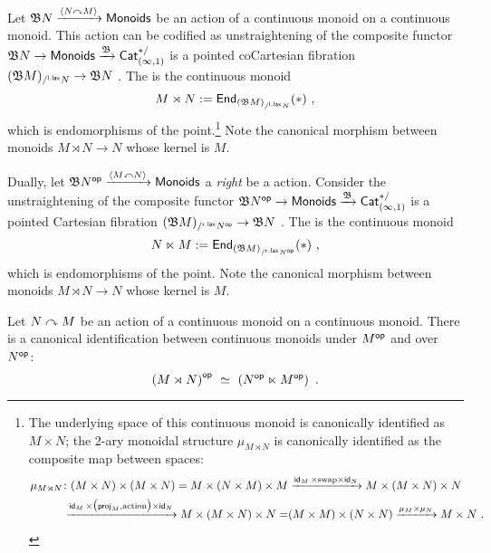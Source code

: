 Let $\mathfrak B N \xrightarrow{\langle N \curvearrowright M \rangle } {\sf Monoids}$ be an action of a continuous monoid on a continuous monoid.
This action can be codified as unstraightening of the composite functor $\mathfrak B N \to {\sf Monoids} \xrightarrow{ \mathfrak B }\operatorname{{\sf Cat}}^{\ast/}_{(\infty,1)}$ is a pointed coCartesian fibration
$
(\mathfrak B M)_{/^{\sf l.lax} N}
\to
\mathfrak B N
$
.
The  is the continuous monoid
\[
M \rtimes N := \operatorname{\sf End}_{(\mathfrak B M)_{/^{\sf l.lax} N}} ( \ast )
~,
\]
which is endomorphisms of the point.\footnote{The underlying space of this continuous monoid is canonically identified as $M \times N$;
the 2-ary monoidal structure $\mu_{M \rtimes N}$ is canonically identified as the composite map between spaces:
\begin{eqnarray*}
\mu_{M \rtimes N }
\colon
(M \times N) \times (M \times N)
=
M \times (N \times M) \times M
&
\xrightarrow{ \operatorname{\sf id}_M \times {\rm swap} \times \operatorname{\sf id}_N} M \times ( M \times N ) \times N
\\
\xrightarrow{ \operatorname{\sf id}_M \times \bigl( {\sf proj}_M , {\rm action} \bigr) \times \operatorname{\sf id}_N }
M \times ( M \times N ) \times N =
&
( M \times M ) \times ( N \times N )
\xrightarrow{ \mu_M \times \mu_N }  M \times N 
~.
\end{eqnarray*}
}
Note the canonical morphism between monoids $M \rtimes N \to N$ whose kernel is $M$.


Dually, let $\mathfrak B N^{\operatorname{\mathsf{op}}} \xrightarrow{\langle M \curvearrowleft N \rangle} {\sf Monoids}$ a \emph{right} be a action.
Consider the unstraightening of the composite functor $\mathfrak B N^{\operatorname{\mathsf{op}}} \to {\sf Monoids} \xrightarrow{ \mathfrak B }\operatorname{{\sf Cat}}^{\ast/}_{(\infty,1)}$ is a pointed Cartesian fibration
$
(\mathfrak B M)_{/^{\sf r.lax} N^{\operatorname{\mathsf{op}}}}
\to
\mathfrak B N
$
.
The  is the continuous monoid
\[
N \ltimes M := \operatorname{\sf End}_{(\mathfrak B M)_{/^{\sf r.lax} N^{\operatorname{\mathsf{op}}}}} ( \ast )
~,
\]
which is endomorphisms of the point.  
Note the canonical morphism between monoids $M \rtimes N \to N$ whose kernel is $M$.


\begin{observation}
\label{f5}
Let $N \curvearrowright M$ be an action of a continuous monoid on a continuous monoid.
There is a canonical identification between continuous monoids under $M^{\operatorname{\mathsf{op}}}$ and over $N^{\operatorname{\mathsf{op}}}$:
\[
\left(
M \rtimes N
\right)^{\operatorname{\mathsf{op}}}
~\simeq~
\left(
N^{\operatorname{\mathsf{op}}}
\ltimes 
M^{\operatorname{\mathsf{op}}}
\right)
~.
\]

\end{observation}




